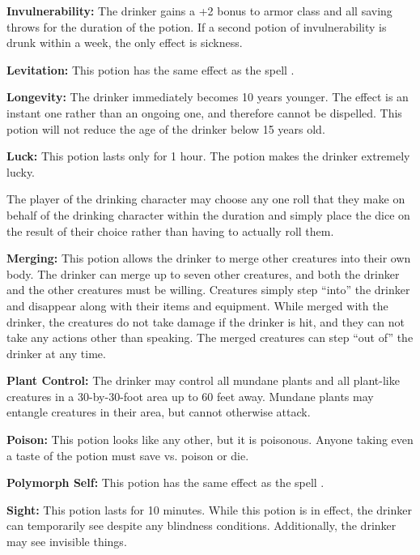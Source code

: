 \begin{multicols*}{2}
\textbf{Invulnerability:} The drinker gains a +2 bonus to armor class and all saving throws for the duration of the potion. If a second potion of invulnerability is drunk within a week, the only effect is sickness.

\textbf{Levitation:} This potion has the same effect as the spell .

\textbf{Longevity:} The drinker immediately becomes 10 years younger. The effect is an instant one rather than an ongoing one, and therefore cannot be dispelled. This potion will not reduce the age of the drinker below 15 years old.

\textbf{Luck:} This potion lasts only for 1 hour. The potion makes the drinker extremely lucky.

The player of the drinking character may choose any one roll that they make on behalf of the drinking character within the duration and simply place the dice on the result of their choice rather than having to actually roll them.

\textbf{Merging:} This potion allows the drinker to merge other creatures into their own body. The drinker can merge up to seven other creatures, and both the drinker and the other creatures must be willing. Creatures simply step “into” the drinker and disappear along with their items and equipment. While merged with the drinker, the creatures do not take damage if the drinker is hit, and they can not take any actions other than speaking. The merged creatures can step “out of” the drinker at any time.

\textbf{Plant Control:} The drinker may control all mundane plants and all plant-like creatures in a 30-by-30-foot area up to 60 feet away. Mundane plants may entangle creatures in their area, but cannot otherwise attack.

\textbf{Poison:} This potion looks like any other, but it is poisonous. Anyone taking even a taste of the potion must save vs. poison or die.

\textbf{Polymorph Self:} This potion has the same effect as the spell .

\textbf{Sight:} This potion lasts for 10 minutes. While this potion is in effect, the drinker can temporarily see despite any blindness conditions. Additionally, the drinker may see invisible things.


\end{multicols*}
